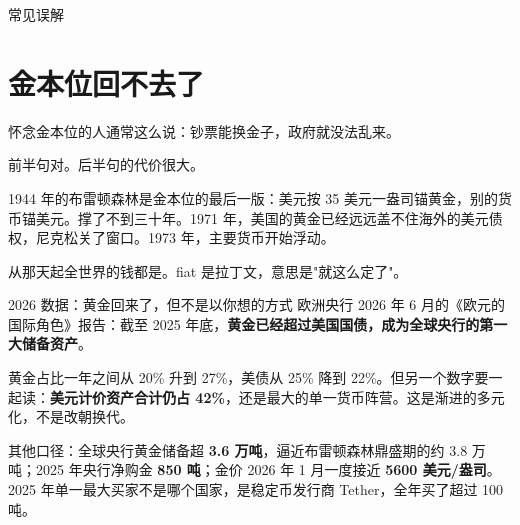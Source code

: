 \begin{mythbox}{常见误解}
\end{mythbox}

\section{金本位回不去了}

怀念金本位的人通常这么说：钞票能换金子，政府就没法乱来。

前半句对。后半句的代价很大。

\begin{flowlist}
\end{flowlist}

1944 年的布雷顿森林是金本位的最后一版：美元按 35 美元一盎司锚黄金，别的货币锚美元。撑了不到三十年。1971 年，美国的黄金已经远远盖不住海外的美元债权，尼克松关了窗口。1973 年，主要货币开始浮动。

从那天起全世界的钱都是。fiat 是拉丁文，意思是"就这么定了"。

\begin{databox}{2026 数据：黄金回来了，但不是以你想的方式}
欧洲央行 2026 年 6 月的《欧元的国际角色》报告：截至 2025 年底，\textbf{黄金已经超过美国国债，成为全球央行的第一大储备资产}。

\begin{barfig}
\end{barfig}

黄金占比一年之间从 20\% 升到 27\%，美债从 25\% 降到 22\%。但另一个数字要一起读：\textbf{美元计价资产合计仍占 42\%}，还是最大的单一货币阵营。这是渐进的多元化，不是改朝换代。

其他口径：全球央行黄金储备超 \textbf{3.6 万吨}，逼近布雷顿森林鼎盛期的约 3.8 万吨；2025 年央行净购金 \textbf{850 吨}；金价 2026 年 1 月一度接近 \textbf{5600 美元/盎司}。2025 年单一最大买家不是哪个国家，是稳定币发行商 Tether，全年买了超过 100 吨。

\end{databox}

